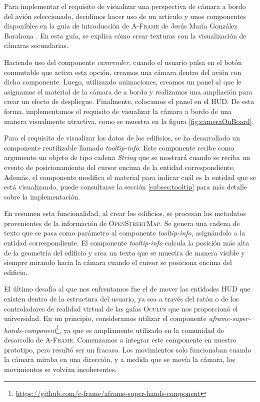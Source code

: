 \documentclass[a4paper, 11pt]{book}
\begin{document}
Para implementar el requisito de visualizar una perspectiva de cámara a bordo del avión seleccionado, decidimos hacer uso de un artículo y unos componentes disponibles en la guía de introducción de \textsc{A-Frame} de Jesús María González Barahona \cite{aframe_notes}. En esta guía, se explica cómo crear texturas con la visualización de cámaras secundarias.

Haciendo uso del componente \emph{camrender}, cuando el usuario pulsa en el botón conmutable que activa esta opción, creamos una cámara dentro del avión con dicho componente. Luego, utilizando animaciones, creamos un panel al que le asignamos el material de la cámara de a bordo y realizamos una ampliación para crear un efecto de despliegue. Finalmente, colocamos el panel en el \textsc{HUD}. De esta forma, implementamos el requisito de visualizar la cámara a bordo de una manera visualmente atractiva, como se muestra en la figura \ref{fig:cameraOnBoard}.

Para el requisito de visualizar los datos de los edificios, se ha desarrollado un componente reutilizable llamado \emph{tooltip-info}. Este componente recibe como argumento un objeto de tipo cadena \emph{String} que se mostrará cuando se reciba un evento de posicionamiento del cursor encima de la entidad correspondiente. Además, el componente modifica el material para indicar cuál es la entidad que se está visualizando, puede consultarse la sección \ref{subsec:tooltip} para más detalle sobre la implementación.

En resumen esta funcionalidad, al crear los edificios, se procesan los metadatos provenientes de la información de \textsc{OpenStreetMap}. Se genera una cadena de texto que se pasa como parámetro al componente \emph{tooltip-info}, asignándolo a la entidad correspondiente. El componente \emph{tooltip-info} calcula la posición más alta de la geometría del edificio y crea un texto que se muestra de manera visible y siempre mirando hacia la cámara cuando el cursor se posiciona encima del edificio.

El último desafío al que nos enfrentamos fue el de mover las entidades \textsc{HUD} que existen dentro de la estructura del usuario, ya sea a través del ratón o de los controladores de realidad virtual de las gafas \textsc{Oculus} que nos proporcionó el universidad. En un principio, consideramos utilizar el componente \emph{aframe-super-hands-component}\footnote{\url{https://github.com/c-frame/aframe-super-hands-component}}, ya que es ampliamente utilizado en la comunidad de desarrollo de \textsc{A-Frame}. Comenzamos a integrar este componente en nuestro prototipo, pero resultó ser un fracaso. Los movimientos solo funcionaban cuando la cámara miraba en una dirección, y a medida que se movía la cámara, los movimientos se volvían incoherentes.
\end{document}

